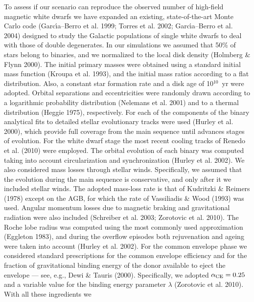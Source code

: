 \documentclass[]{emulateapj}
\begin{document}
To  assess  if our  scenario  can  reproduce  the observed  number  of
high-field  magnetic  white  dwarfs  we  have  expanded  an  existing,
state-of-the-art  Monte Carlo  code (Garc\'\i  a--Berro et  al.  1999;
Torres et al.  2002; Garc\'\i a--Berro et al.  2004) designed to study
the Galactic populations of single  white dwarfs to deal with those of
double degenerates.  In our simulations  we assumed that 50\% of stars
belong  to binaries,  and  we  normalized to  the  local disk  density
(Holmberg \&  Flynn 2000).  The  initial primary masses  were obtained
using a standard  initial mass function (Kroupa et  al. 1993), and the
initial  mass  ratios  according  to  a flat  distribution.   Also,  a
constant  star formation  rate and  a  disk age  of 10$^{10}$~yr  were
adopted.  Orbital  separations and eccentricities  were randomly drawn
according  to  a  logarithmic  probability distribution  (Nelemans  et
al. 2001)  and to a thermal distribution  (Heggie 1975), respectively.
For each of  the components of the binary  analytical fits to detailed
stellar  evolutionary tracks were  used (Hurley  et al.   2000), which
provide full coverage from the  main sequence until advances stages of
evolution.  For the  white dwarf stage the most  recent cooling tracks
of Renedo et al. (2010)  were employed.  The orbital evolution of each
binary   was  computed   taking  into   account   circularization  and
synchronization (Hurley et al.  2002).  We also considered mass losses
through stellar  winds.  Specifically,  we assumed that  the evolution
during  the  main sequence  is  conservative,  and  only after  it  we
included  stellar  winds.   The  adopted  mass-loss rate  is  that  of
Kudritzki \& Reimers  (1978) except on the AGB, for  which the rate of
Vassiliadis \& Wood  (1993) was used.  Angular momentum  losses due to
magnetic  braking  and  gravitational  radiation  were  also  included
(Schreiber  et al.   2003; Zorotovic  et al.   2010).  The  Roche lobe
radius  was  computed  using  the  most  commonly  used  approximation
(Eggleton 1983),  and during  the overflow episodes  both rejuvenation
and ageing  were taken  into account (Hurley  et al.  2002).   For the
common  envelope phase  we considered  standard prescriptions  for the
common  envelope  efficiency and  for  the  fraction of  gravitational
binding energy of  the donor available to eject  the envelope --- see,
e.g., Dewi  \& Tauris  (2000).  Specifically, we  adopted $\alpha_{\rm
CE}=0.25$  and  a variable  value  for  the  binding energy  parameter
$\lambda$  (Zorotovic et al.   2010).  With  all these  ingredients we
\end{document}
